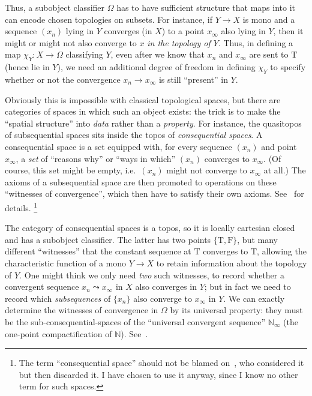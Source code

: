 \documentclass[12pt]{article}
\def\oo{\ensuremath{\infty}}
\def\N{\mathbb{N}}
\def\true{\mathrm{T}}
\def\false{\mathrm{F}}
\numberwithin{equation}{section}
\begin{document}
Thus, a subobject classifier $\Omega$ has to have sufficient structure that maps into it can encode chosen topologies on subsets.
For instance, if $Y\to X$ is mono and a sequence $(x_n)$ lying in $Y$ converges (in $X$) to a point $x_\oo$ also lying in $Y$, then it might or might not also converge to $x$ \emph{in the topology of $Y$}.
Thus, in defining a map $\chi_Y: X\to \Omega$ classifying $Y$, even after we know that $x_n$ and $x_\oo$ are sent to $\true$ (hence lie in $Y$), we need an additional degree of freedom in defining $\chi_Y$ %
to specify whether or not the convergence $x_n \to x_\oo$ is still ``present'' in $Y$.

Obviously this is impossible with classical topological spaces, %
but there are categories of spaces in which such an object exists:
the trick is to make the ``spatial structure'' into \emph{data} rather than a \emph{property}.
For instance, the quasitopos of subsequential spaces sits inside the topos of \emph{consequential spaces}.
A consequential space is a set equipped with, for every sequence $(x_n)$ and point $x_\oo$, a \emph{set} of ``reasons why'' or ``ways in which'' $(x_n)$ converges to $x_\oo$.
(Of course, this set might be empty, i.e.\ $(x_n)$ might not converge to $x_\oo$ at all.)
The axioms of a subsequential space are then promoted to operations on these ``witnesses of convergence'', which then have to satisfy their own axioms.
See~\cite{ptj:topological-topos} for details.%
\footnote{The term ``consequential space'' should not be blamed on~\cite{ptj:topological-topos}, who considered it but then discarded it.
  I have chosen to use it anyway, since I know no other term for such spaces.}

The category of consequential spaces is a topos, so it is locally cartesian closed and has a subobject classifier.
The latter has two points $\{\true,\false\}$, but many different ``witnesses'' that the constant sequence at $\true$ converges to $\true$, allowing the characteristic function of a mono $Y\to X$ to retain information about the topology of $Y$.
One might think we only need \emph{two} such witnesses, to record whether a convergent sequence $x_n\leadsto x_\oo$ in $X$ also converges in $Y$; but in fact we need to record which \emph{subsequences} of $\{x_n\}$ also converge to $x_\oo$ in $Y$.
We can exactly determine the witnesses of convergence in $\Omega$ by its universal property: they must be the sub-consequential-spaces of the ``universal convergent sequence'' $\N_\oo$ (the one-point compactification of $\N$).
See~\cite[Corollary 4.2]{ptj:topological-topos}.
\end{document}
